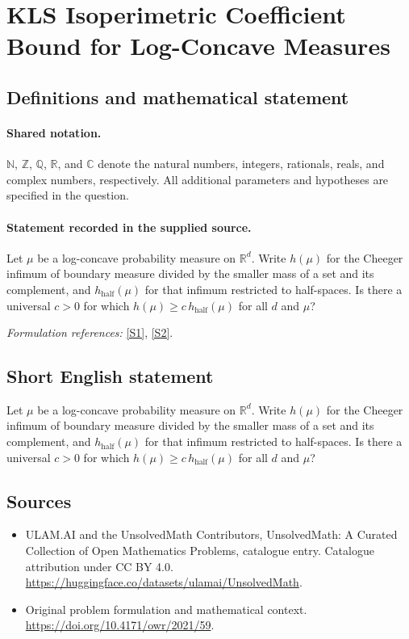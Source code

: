 \documentclass[11pt]{article}
\newcommand{\sref}[2]{\hyperlink{source:#1:#2}{[S#2]}}
\begin{document}
\section{KLS Isoperimetric Coefficient Bound for Log-Concave Measures}\label{statement}

\subsection{Definitions and mathematical statement}

\paragraph{Shared notation.}$\mathbb N$, $\mathbb Z$, $\mathbb Q$, $\mathbb R$, and $\mathbb C$ denote the natural numbers, integers, rationals, reals, and complex numbers, respectively. All additional parameters and hypotheses are specified in the question.


\paragraph{Statement recorded in the supplied source.}
Let $\mu$ be a log-concave probability measure on $\mathbb R^d$. Write $h(\mu)$ for the Cheeger infimum of boundary measure divided by the smaller mass of a set and its complement, and $h_{\mathrm{half}}(\mu)$ for that infimum restricted to half-spaces. Is there a universal $c>0$ for which $h(\mu)\geq c\,h_{\mathrm{half}}(\mu)$ for all $d$ and $\mu$?
\par\smallskip\textit{Formulation references:} \sref{statement}{1}, \sref{statement}{2}.
\subsection{Short English statement}
Let $\mu$ be a log-concave probability measure on $\mathbb R^d$. Write $h(\mu)$ for the Cheeger infimum of boundary measure divided by the smaller mass of a set and its complement, and $h_{\mathrm{half}}(\mu)$ for that infimum restricted to half-spaces. Is there a universal $c>0$ for which $h(\mu)\geq c\,h_{\mathrm{half}}(\mu)$ for all $d$ and $\mu$?
\subsection{Sources}
\begin{itemize}
\item[\hypertarget{source:statement:1}{S1}] ULAM.AI and the UnsolvedMath Contributors, UnsolvedMath: A Curated Collection of Open Mathematics Problems, catalogue entry. Catalogue attribution under CC BY 4.0.
\url{https://huggingface.co/datasets/ulamai/UnsolvedMath}.
\item[\hypertarget{source:statement:2}{S2}] Original problem formulation and mathematical context.
\url{https://doi.org/10.4171/owr/2021/59}.
\end{itemize}
\label{end:statement}
\end{document}
